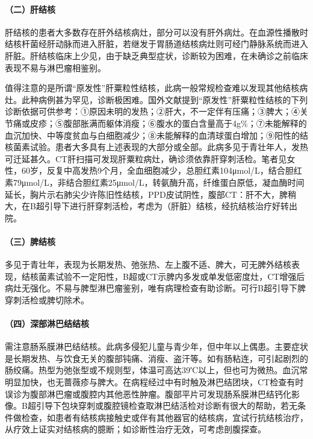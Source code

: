 \paragraph{（二）肝结核}

肝结核的患者大多数存在肝外结核病灶，部分可以没有肝外病灶。在血源性播散时结核杆菌经肝动脉而进入肝脏，若继发于胃肠道结核病灶则可经门静脉系统而进入肝脏。肝结核临床上少见，由于缺乏典型症状，诊断较为困难，在未确诊之前临床表现不易与淋巴瘤相鉴别。

值得注意的是所谓“原发性”肝粟粒性结核，此病一般常规检查难以发现其他结核病灶。此种病例甚为罕见，诊断极困难。国外文献提到“原发性”肝粟粒性结核的下列诊断依据可供参考：①原因未明的发热；②肝大，不一定伴有压痛；③脾大；④关节痛或皮疹；⑤腹部胀满而躯体消瘦；⑥腹水的蛋白含量高于4g\%；⑦未能解释的血沉加快、中等度贫血与白细胞减少；⑧未能解释的血清球蛋白增加；⑨阳性的结核菌素试验。患者大多具有上述表现的大部分或全部。此病多见于青壮年人，发热可迁延甚久。CT肝扫描可发现肝粟粒病灶，确诊须依靠肝穿刺活检。笔者见女性，60岁，反复中高发热9个月，全血细胞减少，总胆红素104μmol/L，结合胆红素79μmol/L，非结合胆红素25μmol/L，转氨酶升高，纤维蛋白原低，凝血酶时间延长，胸片示右肺尖少许陈旧性结核，PPD皮试阴性，腹部CT：肝不大，脾稍大，在B超引导下进行肝穿刺活检，考虑为（肝脏）结核，经抗结核治疗好转出院。

\paragraph{（三）脾结核}

多见于青壮年，表现为长期发热、弛张热、左上腹不适、脾大，可无脾外结核表现，结核菌素试验不一定阳性，B超或CT示脾内多发或单发低密度灶，CT增强后病灶无强化。不易与脾型淋巴瘤鉴别，唯有病理检查有助诊断。可行B超引导下脾穿刺活检或脾切除术。

\paragraph{（四）深部淋巴结结核}

需注意肠系膜淋巴结结核。此病多侵犯儿童与青少年，但中年以上偶患。主要症状是长期发热、与饮食无关的腹部钝痛、消瘦、盗汗等。如有肠粘连，可引起剧烈的肠绞痛。热型为弛张型或不规则型，体温可高达39℃以上，但也可为微热。血沉常明显加快，也无蔷薇疹与脾大。在病程经过中有时触及淋巴结团块，CT检查有时误诊为腹部淋巴瘤或腹腔内其他恶性肿瘤。腹部平片可发现肠系膜淋巴结钙化影像。B超引导下包块穿刺或腹腔镜检查取淋巴结活检对诊断有很大的帮助，若无条件做检查，如患者有结核病接触史或伴有其他器官的结核病，宜试行抗结核治疗，从疗效上证实对结核病的臆断；如诊断性治疗无效，可考虑剖腹探查。

